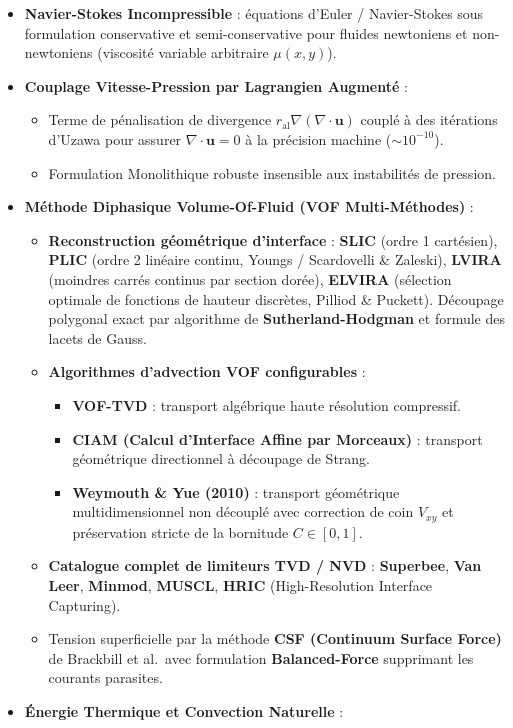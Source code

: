 \documentclass[
  french,
]{article}
\providecommand{\tightlist}{%
  \setlength{\itemsep}{0pt}\setlength{\parskip}{0pt}}
\begin{document}
\begin{itemize}
\tightlist
\item
  \textbf{Navier-Stokes Incompressible} : équations d'Euler /
  Navier-Stokes sous formulation conservative et semi-conservative pour
  fluides newtoniens et non-newtoniens (viscosité variable arbitraire
  \(\mu(x, y)\)).
\item
  \textbf{Couplage Vitesse-Pression par Lagrangien Augmenté} :

  \begin{itemize}
  \tightlist
  \item
    Terme de pénalisation de divergence
    \(r_{\text{al}} \nabla(\nabla \cdot \mathbf{u})\) couplé à des
    itérations d'Uzawa pour assurer \(\nabla \cdot \mathbf{u} = 0\) à la
    précision machine (\(\sim 10^{-10}\)).
  \item
    Formulation Monolithique robuste insensible aux instabilités de
    pression.
  \end{itemize}
\item
  \textbf{Méthode Diphasique Volume-Of-Fluid (VOF Multi-Méthodes)} :

  \begin{itemize}
  \tightlist
  \item
    \textbf{Reconstruction géométrique d'interface} : \textbf{SLIC}
    (ordre 1 cartésien), \textbf{PLIC} (ordre 2 linéaire continu, Youngs
    / Scardovelli \& Zaleski), \textbf{LVIRA} (moindres carrés continus
    par section dorée), \textbf{ELVIRA} (sélection optimale de fonctions
    de hauteur discrètes, Pilliod \& Puckett). Découpage polygonal exact
    par algorithme de \textbf{Sutherland-Hodgman} et formule des lacets
    de Gauss.
  \item
    \textbf{Algorithmes d'advection VOF configurables} :

    \begin{itemize}
    \tightlist
    \item
      \textbf{VOF-TVD} : transport algébrique haute résolution
      compressif.
    \item
      \textbf{CIAM (Calcul d'Interface Affine par Morceaux)} : transport
      géométrique directionnel à découpage de Strang.
    \item
      \textbf{Weymouth \& Yue (2010)} : transport géométrique
      multidimensionnel non découplé avec correction de coin \(V_{xy}\)
      et préservation stricte de la bornitude \(C \in [0, 1]\).
    \end{itemize}
  \item
    \textbf{Catalogue complet de limiteurs TVD / NVD} :
    \textbf{Superbee}, \textbf{Van Leer}, \textbf{Minmod},
    \textbf{MUSCL}, \textbf{HRIC} (High-Resolution Interface Capturing).
  \item
    Tension superficielle par la méthode \textbf{CSF (Continuum Surface
    Force)} de Brackbill et al.~avec formulation \textbf{Balanced-Force}
    supprimant les courants parasites.
  \end{itemize}
\item
  \textbf{Énergie Thermique et Convection Naturelle} :


\end{itemize}
\end{document}

